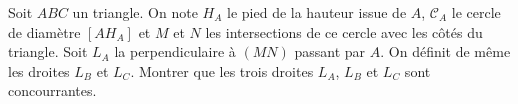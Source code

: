Soit $ABC$ un triangle. On note $H_A$ le pied de la hauteur issue de $A$, $\mathcal{C}_A$ le cercle de diamètre $[AH_A]$ et $M$ et $N$ les intersections de ce cercle avec les côtés du triangle. Soit $L_A$ la perpendiculaire à $(MN)$ passant par $A$. On définit de même les droites $L_B$ et $L_C$. Montrer que les trois droites $L_A$, $L_B$ et $L_C$ sont concourrantes.

